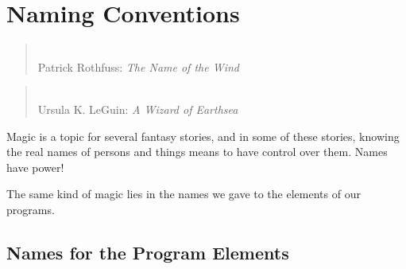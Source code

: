 \part{Naming Conventions}\label{sec:NamingConventions}

\begin{quote}
 \\
Patrick Rothfuss: \textit{The Name of the Wind} \autocite{Rothfuss:NameOfTheWind}
\end{quote}

\begin{quote}
 \\
Ursula K. LeGuin: \textit{A Wizard of Earthsea} \autocite{LeGuin:WizardOfEarthsea}
\end{quote}

Magic is a topic for several fantasy stories, and in some of these stories, knowing the real names of persons and things means to have control over them. Names have power!

The same kind of magic lies in the names we gave to the elements of our programs.





\chapter{Names for the Program Elements}



















